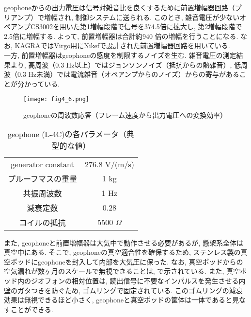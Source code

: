 \quad geophoneからの出力電圧は信号対雑音比を良くするために前置増幅器回路（プリアンプ）で増幅され, 制御システムに送られる. このとき, 雑音電圧が少ないオペアンプCS3002を用いた第1増幅段階で信号を374.5倍に拡大し, 第2増幅段階で2.5倍に増幅する. よって, 前置増幅器は合計約940 倍の増幅を行うことになる. なお, KAGRAではVirgo用にNikefで設計された前置増幅器回路を用いている. \\
\quad 一方, 前置増幅器はgeophoneの感度を制限するノイズを生む. 雑音電圧の測定結果より, 高周波（0.3 Hz以上）ではジョンソンノイズ（抵抗からの熱雑音）, 低周波（0.3 Hz未満）では電流雑音（オペアンプからのノイズ）からの寄与があることが分かっている\cite{38}. 
\begin{figure}[H]
\begin{center}
\texttt{[image: fig4\_6.png]} 
\caption[geophoneの周波数応答]{geophoneの周波数応答（フレーム速度から出力電圧への変換効率）}
\label{fig4.6}
\end{center}
\end{figure}
\begin{table}[H]
 \centering
  \begin{tabular}{cc}
   \hline\hline 
   generator constant & 276.8 V/(m/s) \\
   プルーフマスの重量 & 1 kg \\
   共振周波数         & 1 Hz \\
   減衰定数           & 0.28 \\
   コイルの抵抗       & 5500 $\Omega$ \\
   \hline
  \end{tabular}
 \caption[geophone (L-4C)の各パラメータ]{geophone (L-4C)の各パラメータ（典型的な値）}
 \label{table4.2}
\end{table}
また, geophoneと前置増幅器は大気中で動作させる必要があるが, 懸架系全体は真空中にある. そこで, geophoneの真空適合性を確保するため, ステンレス製の真空ポッドにgeophoneを封入して内部を大気圧に保った. なお, 真空ポッドからの空気漏れが数ヶ月のスケールで無視できることは, \cite{38}で示されている. また, 真空ポッド内のジオフォンの相対位置は, 読出信号に不要なインパルスを発生させる内壁のガタつきを防ぐため, ゴムリングで固定されている. このゴムリングの減衰効果は無視できるほど小さく, geophoneと真空ポッドの筐体は一体であると見なすことができる. 
